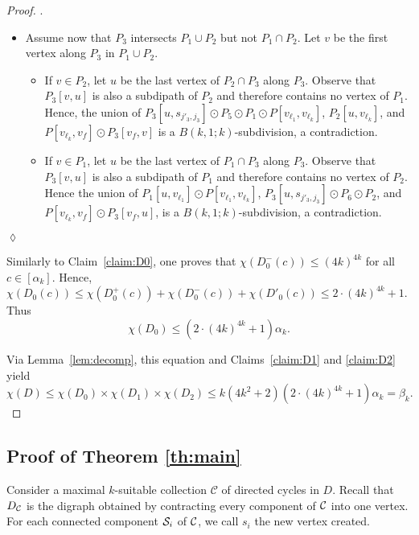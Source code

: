 \documentclass[utf8,10pt]{article}
\theoremstyle{plain}
\theoremstyle{definition}
\theoremstyle{remark}
\newenvironment{subproof}{\par\noindent {\it Subproof}.\ }{\hfill$\lozenge$\par\vspace{11pt}}
\begin{document}
\begin{proof}
\begin{subproof}
\begin{itemize}
	\item Assume now that $P_3$ intersects $P_1\cup P_2$ but not $P_1\cap P_2$. Let $v$ be the first vertex along $P_3$ in $P_1\cup P_2$.
	\begin{itemize}
	\item If $v \in P_2$, let $u$ be the last vertex of $P_2\cap P_3$ along $P_3$. Observe that $P_3[v,u]$ is also a subdipath of $P_2$ and therefore contains no vertex of $P_1$. Hence, the union of $P_3[u, s_{j'_3,j_3}]\odot P_5 \odot P_1\odot P[v_{\ell_1},v_{\ell_k}]$,  $P_2[u,v_{\ell_k}]$, and $P[v_{\ell_k}, v_f] \odot P_3[v_f,v]$ is a $B(k,1;k)$-subdivision, a contradiction.
	
	
	\item If $v\in P_1$, let $u$ be the last vertex of $P_1\cap P_3$ along $P_3$.  Observe that $P_3[v,u]$ is also a subdipath of $P_1$ and therefore contains no vertex of $P_2$. 
	Hence the union of $P_1[u, v_{\ell_1}]\odot P[v_{\ell_1}, v_{\ell_k}]$, $P_3[u, s_{j'_3,j_3}]\odot P_6 \odot P_2$, and $P[v_{\ell_k}, v_f] \odot P_3[v_f,u]$,  is a $B(k,1;k)$-subdivision, a contradiction.

	\end{itemize}

\end{itemize}
\end{subproof}



Similarly to Claim~\ref{claim:D0}, one proves that $\chi(D^-_0(c))\leq (4k)^{4k}$ for all $c\in [\alpha_k]$.
Hence, $\chi(D_0(c)) \leq \chi(D^+_0(c)) + \chi(D^-_0(c)) + \chi(D'_0(c)) \leq 2\cdot (4k)^{4k} + 1$.
Thus  $$\chi(D_0) \leq (2\cdot (4k)^{4k} + 1) \alpha_k.$$


Via Lemma~\ref{lem:decomp}, this equation and Claims~\ref{claim:D1} and  \ref{claim:D2} yield
$$\chi(D) \leq \chi(D_0)\times \chi(D_1) \times \chi(D_2) \leq k(4k^2+2)(2\cdot (4k)^{4k} + 1) \alpha_k = \beta_k.$$
\end{proof}





\subsection{Proof of Theorem \ref{th:main}}

Consider  a maximal $k$-suitable collection $\mathcal{C}$ of directed cycles in $D$. Recall that $D_{\cal C}$ is the digraph obtained by contracting 
every component of ${\cal C}$ into one vertex. For each connected component ${\cal S}_i$ of ${\cal C}$, we call $s_i$ the
new vertex created.
\end{document}
